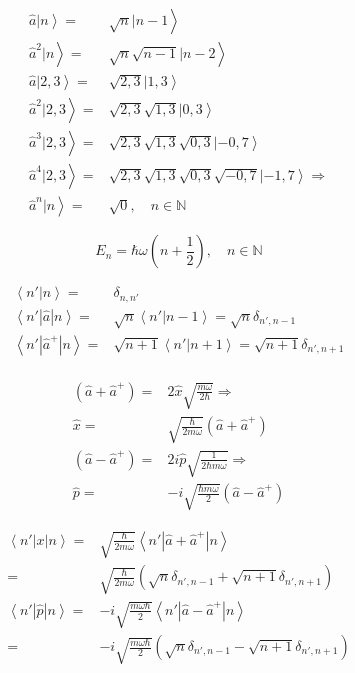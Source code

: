 	
		\begin{align}
			\left. \hat{a} | n \right\rangle =& \left.\sqrt{n}|n-1\right\rangle \\
			\left. \hat{a}^2 | n \right\rangle =& \left.\sqrt{n}\sqrt{n-1}|n-2\right\rangle \\
			\left. \hat{a} | 2,3 \right\rangle =& \left.\sqrt{2,3}|1,3\right\rangle \\
			\left. \hat{a}^2 | 2,3 \right\rangle =& \left.\sqrt{2,3}\sqrt{1,3}|0,3\right\rangle \\		
			\left. \hat{a}^3 | 2,3 \right\rangle =& \left.\sqrt{2,3}\sqrt{1,3}\sqrt{0,3}|-0,7\right\rangle \\		
			\left. \hat{a}^4 | 2,3 \right\rangle =& \left.\sqrt{2,3}\sqrt{1,3}\sqrt{0,3}\sqrt{-0,7}|-1,7\right\rangle \Rightarrow\\				
			\left. \hat{a}^n | n \right\rangle =& \sqrt{0}, \quad n  \in \mathds{N}
		\end{align}
	
		\begin{equation}
			E_n = \hbar\omega\left(n + \frac{1}{2}\right), \quad n \in \mathds{N}
		\end{equation}
		
		\begin{align}
			\left\langle n' | n \right\rangle =& \delta_{n, n'} \\
			\left\langle n' | \hat{a} | n \right\rangle =& \sqrt{n}\left\langle n' | n - 1 \right\rangle = \sqrt{n}\delta_{n', n-1}\\
			\left\langle n' | \hat{a}^+ | n \right\rangle =& \sqrt{n+1}\left\langle n' | n + 1 \right\rangle = \sqrt{n+1}\delta_{n', n+1} \\
		\end{align}
		
		\begin{align}
			(\hat{a} + \hat{a}^+) =& 2\hat{x}\sqrt{\frac{m\omega}{2\hbar}} \Rightarrow \\
			\hat{x} =& \sqrt{\frac{\hbar}{2m\omega}}\left(\hat{a}+\hat{a}^+\right) \\
			(\hat{a} - \hat{a}^+) =& 2i\hat{p}\sqrt{\frac{1}{2\hbar m\omega}} \Rightarrow\\
			\hat{p} =& -i\sqrt{\frac{\hbar m \omega}{2}}\left(\hat{a} - \hat{a}^+\right)
		\end{align}
		
		\begin{align}
			\left\langle n' | x | n \right\rangle =& \sqrt{\frac{\hbar}{2 m \omega}} \left\langle n' | \hat{a} + \hat{a}^+ | n \right\rangle \\
			=&  \sqrt{\frac{\hbar}{2 m \omega}}\left(\sqrt{n}\delta_{n', n-1} + \sqrt{n+1}\delta_{n', n+1}\right) \\
			\left\langle n' | \hat{p} | n \right\rangle =& -i\sqrt{\frac{m \omega\hbar}{2}} \left\langle n' | \hat{a} - \hat{a}^+ | n \right\rangle \\
			=&  -i\sqrt{\frac{m \omega\hbar}{2}}\left(\sqrt{n}\delta_{n', n-1} - \sqrt{n+1}\delta_{n', n+1}\right) \\
		\end{align}
	
